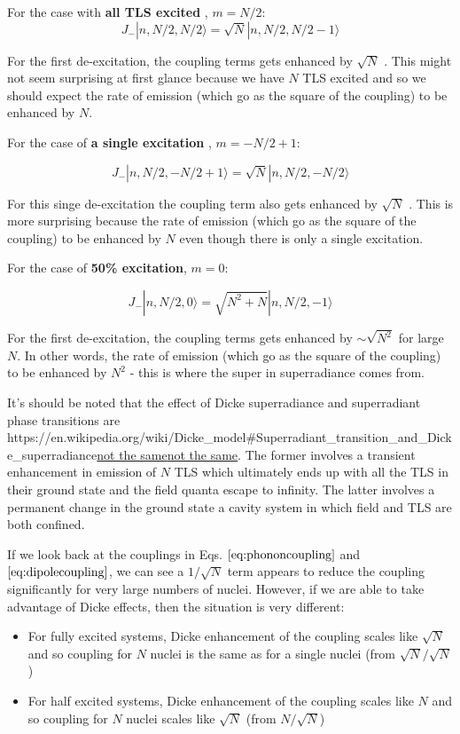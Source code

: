 \documentclass[
]{article}
\let\oldhref\href
\renewcommand{\href}[2]{\ifx#1\urlprefix\oldhref{#1}{#2}\else\uline{\oldhref{#1}{#2}}\fi}
\renewcommand{\[}{\begin{equation}}
\renewcommand{\]}{\end{equation}}
\providecommand{\tightlist}{%
  \setlength{\itemsep}{0pt}\setlength{\parskip}{0pt}}
\begin{document}
For the case with \textbf{all TLS excited} , \(m=N/2\): \[
J_- |n, N/2, N/2\rangle  = \sqrt{N} |n, N/2, N/2 - 1\rangle
\]

For the first de-excitation, the coupling terms gets enhanced by
\(\sqrt{N}\) . This might not seem surprising at first glance because we
have \(N\) TLS excited and so we should expect the rate of emission
(which go as the square of the coupling) to be enhanced by \(N\).

For the case of \textbf{a single excitation} , \(m=-N/2 + 1\):

\[
J_- |n, N/2, -N/2 +1\rangle  = \sqrt{N}|n, N/2, -N/2\rangle
\]

For this singe de-excitation the coupling term also gets enhanced by
\(\sqrt{N}\) . This is more surprising because the rate of emission
(which go as the square of the coupling) to be enhanced by \(N\) even
though there is only a single excitation.

For the case of \textbf{50\% excitation}, \(m=0\):

\[
J_- |n, N/2, 0 \rangle  = \sqrt{N^2 + N}|n, N/2, -1\rangle
\]

For the first de-excitation, the coupling terms gets enhanced by
\(\sim\sqrt{N^2}\) for large \(N\). In other words, the rate of emission
(which go as the square of the coupling) to be enhanced by \(N^2\) -
this is where the super in superradiance comes from.

It's should be noted that the effect of Dicke superradiance and
superradiant phase transitions are
\href{https://en.wikipedia.org/wiki/Dicke_model\#Superradiant_transition_and_Dicke_superradiance}{not
the same}. The former involves a transient enhancement in emission of
\(N\) TLS which ultimately ends up with all the TLS in their ground
state and the field quanta escape to infinity. The latter involves a
permanent change in the ground state a cavity system in which field and
TLS are both confined.

If we look back at the couplings in Eqs. \(\ref{eq:phononcoupling}\) and
\(\ref{eq:dipolecoupling}\), we can see a \(1/\sqrt{N}\) term appears to
reduce the coupling significantly for very large numbers of nuclei.
However, if we are able to take advantage of Dicke effects, then the
situation is very different:

\begin{itemize}
\tightlist
\item
  For fully excited systems, Dicke enhancement of the coupling scales
  like \(\sqrt{N}\) and so coupling for \(N\) nuclei is the same as for
  a single nuclei (from \(\sqrt{N}/\sqrt{N}\))
\item
  For half excited systems, Dicke enhancement of the coupling scales
  like \(N\) and so coupling for \(N\) nuclei scales like \(\sqrt{N}\)
  (from \(N/\sqrt{N}\))
\end{itemize}
\end{document}
